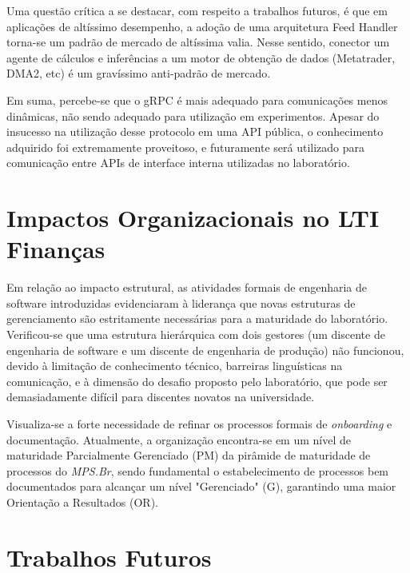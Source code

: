 Uma questão crítica a se destacar, com respeito a trabalhos futuros, é que em aplicações de altíssimo desempenho, a adoção de uma arquitetura Feed Handler torna-se um padrão de mercado de altíssima valia. Nesse sentido, conector um agente de cálculos e inferências a um motor de obtenção de dados (Metatrader, DMA2, etc) é um gravíssimo anti-padrão de mercado.

Em suma, percebe-se que o gRPC é mais adequado para comunicações menos dinâmicas, não sendo adequado para utilização em experimentos. Apesar do insucesso na utilização desse protocolo em uma API pública, o conhecimento adquirido foi extremamente proveitoso, e futuramente será utilizado para comunicação entre APIs de interface interna utilizadas no laboratório.

\section{Impactos Organizacionais no LTI Finanças}

Em relação ao impacto estrutural, as atividades formais de engenharia de software introduzidas evidenciaram à liderança que novas estruturas de gerenciamento são estritamente necessárias para a maturidade do laboratório. Verificou-se que uma estrutura hierárquica com dois gestores (um discente de engenharia de software e um discente de engenharia de produção) não funcionou, devido à limitação de conhecimento técnico, barreiras linguísticas na comunicação, e à dimensão do desafio proposto pelo laboratório, que pode ser demasiadamente difícil para discentes novatos na universidade.

Visualiza-se a forte necessidade de refinar os processos formais de \textit{onboarding} e documentação. Atualmente, a organização encontra-se em um nível de maturidade Parcialmente Gerenciado (PM) da pirâmide de maturidade de processos do \textit{MPS.Br}, sendo fundamental o estabelecimento de processos bem documentados para alcançar um nível "Gerenciado" (G), garantindo uma maior Orientação a Resultados (OR).

\section{Trabalhos Futuros}

